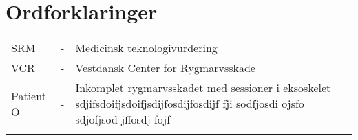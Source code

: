 
\chapter{Ordforklaringer}

\begin{table}[H]
\center
{}
\begin{tabularx}{\linewidth}{l l X}	
SRM         & - &   Medicinsk teknologivurdering \\ \addlinespace[2mm]
VCR         & - &   Vestdansk Center for Rygmarvsskade \\ \addlinespace[2mm]
Patient O   & - &   Inkomplet rygmarvsskadet med sessioner i eksoskelet sdjifsdoifjsdoifjsdijfosdijfosdijf fji sodfjosdi ojsfo sdjofjsod jffosdj fojf \\ \addlinespace[2mm]

\end{tabularx}
\end{table}


